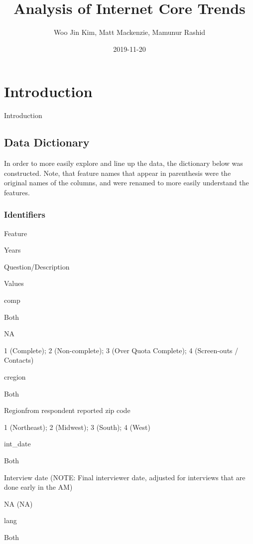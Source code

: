 \documentclass[]{book}
\title{Analysis of Internet Core Trends}
\author{Woo Jin Kim, Matt Mackenzie, Mamunur Rashid}
\date{2019-11-20}
\begin{document}
\maketitle

{
\hypersetup{linkcolor=black}
\setcounter{tocdepth}{1}
\tableofcontents
}
\chapter*{Introduction}\label{introduction}

Introduction

\section*{Data Dictionary}\label{data-dictionary}

In order to more easily explore and line up the data, the dictionary
below was constructed. Note, that feature names that appear in
parenthesis were the original names of the columns, and were renamed to
more easily understand the features.

\subsection*{Identifiers}\label{identifiers}

Feature

Years

Question/Description

Values

comp

Both

NA

1 (Complete); 2 (Non-complete); 3 (Over Quota Complete); 4 (Screen-outs
/ Contacts)

cregion

Both

Regionfrom respondent reported zip code

1 (Northeast); 2 (Midwest); 3 (South); 4 (West)

int\_date

Both

Interview date (NOTE: Final interviewer date, adjusted for interviews
that are done early in the AM)

NA (NA)

lang

Both
\end{document}
